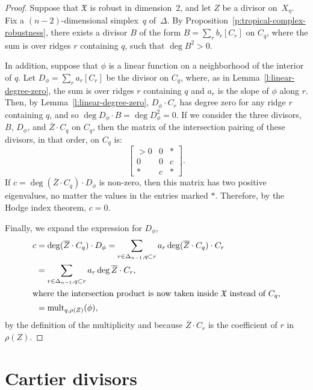 \documentclass[11pt,reqno]{amsart}
\theoremstyle{definition}
\newcommand{\mult}{\operatorname{mult}}
\newcommand{\X}{\mathfrak X}
\begin{document}
\begin{proof}
Suppose that $\X$ is robust in dimension~$2$, and let $Z$ be a divisor
on~$X_\eta$. Fix a $(n-2)$-dimensional simplex~$q$ of~$\Delta$. By
Proposition~\ref{p:tropical-complex-robustness}, there exists a divisor $B$ of
the form $B = \sum_r b_r [C_r]$ on $C_q$, where the sum is over ridges $r$
containing $q$, such that $\deg B^2 > 0$.

In addition, suppose that $\phi$ is a linear function on a neighborhood of the
interior of $q$. Let $D_\phi = \sum_r a_r [C_r]$ be the divisor on $C_q$, where,
as in Lemma~\ref{l:linear-degree-zero}, the sum is over ridges $r$ containing
$q$ and $a_r$ is the slope of $\phi$ along $r$. Then, by
Lemma~\ref{l:linear-degree-zero}, $D_\phi \cdot C_r$ has degree zero for any
ridge $r$ containing $q$, and so $\deg D_\phi \cdot B = \deg D_\phi^2 = 0$. If
we consider the three divisors, $B$, $D_\phi$, and $\overline Z \cdot C_q$ on
$C_q$, then the matrix of the intersection pairing of these divisors, in that
order, on $C_q$
is:
\begin{equation*}
\begin{bmatrix}
> 0 & 0 & * \\
0 & 0 & c \\
* & c & * 
\end{bmatrix}.
\end{equation*}
If $c = \deg (\overline Z \cdot C_q) \cdot D_\phi$ is non-zero, then this matrix
has two positive eigenvalues, no matter the values in the entries marked $*$.
Therefore, by the Hodge index theorem, $c = 0$.

Finally, we expand the expression  for $D_\phi$,
\begin{align*}
c &= \deg (\overline Z \cdot C_q) \cdot D_\phi
= \sum_{r \in \Delta_{n-1}, q \subset r} a_r \deg (\overline Z \cdot C_q) \cdot
C_r  \\
&= \sum_{r \in \Delta_{n-1}, q \subset r} a_r \deg \overline Z \cdot C_r, \\
\intertext{where the intersection product is now taken inside $\X$ instead of $C_q$,}
&= \mult_{q, \rho(Z)}(\phi),
\end{align*}
by the definition of the multiplicity and because $\overline Z \cdot C_r$ is
the coefficient of $r$ in $\rho(Z)$.
\end{proof}

\section{Cartier divisors}\label{s:cartier}
\end{document}

